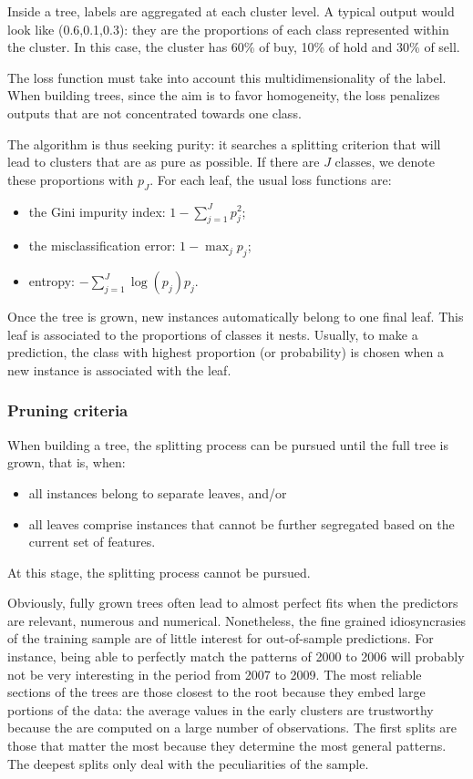 Inside a tree, labels are aggregated at each cluster level. A typical output would look like (0.6,0.1,0.3): they are the proportions of each class represented within the cluster. In this case, the cluster has 60\% of buy, 10\% of hold and 30\% of sell.

The loss function must take into account this multidimensionality of the label. When building trees, since the aim is to favor homogeneity, the loss penalizes outputs that are not concentrated towards one class.

The algorithm is thus seeking purity: it searches a splitting criterion that will lead to clusters that are as pure as possible. If there are $J$ classes, we denote these proportions with $p_{J}$. For each leaf, the usual loss functions are:
\begin{itemize}
    \item the Gini impurity index: $1- \sum_{j=1}^{J} p_{j}^{2}$;
    \item the misclassification error: $1 - \max_{j} p_{j}$;
    \item entropy: $- \sum _{j=1}^{J} \log(p_{j})p_{j}$.
\end{itemize}

Once the tree is grown, new instances automatically belong to one final leaf. This leaf is associated to the proportions of classes it nests. Usually, to make a prediction, the class with highest proportion (or probability) is chosen when a new instance is associated with the leaf.

\subsubsection{Pruning criteria}
When building a tree, the splitting process can be pursued until the full tree is grown, that is, when:
\begin{itemize}
    \item all instances belong to separate leaves, and/or
    \item all leaves comprise instances that cannot be further segregated based on the current set of features.
\end{itemize}
At this stage, the splitting process cannot be pursued.

Obviously, fully grown trees often lead to almost perfect fits when the predictors are relevant, numerous and numerical. Nonetheless, the fine grained idiosyncrasies of the training sample are of little interest for out-of-sample predictions. For instance, being able to perfectly match the patterns of 2000 to 2006 will probably not be very interesting in the period from 2007 to 2009. The most reliable sections of the trees are those closest to the root because they embed large portions of the data: the average values in the early clusters are trustworthy because the are computed on a large number of observations. The first splits are those that matter the most because they determine the most general patterns. The deepest splits only deal with the peculiarities of the sample.

